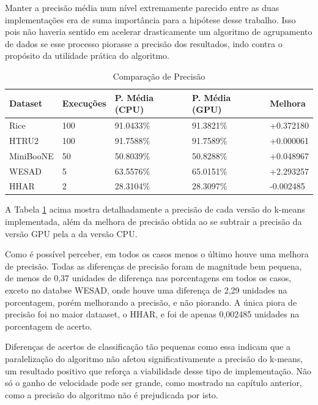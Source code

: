 \documentclass[12pt,
openright, 
oneside, %
a4paper,    %
brazil]{facom-ufu-abntex2}
\begin{document}
Manter a precisão média num nível extremamente parecido entre as duas implementações era de suma importância para a hipótese desse trabalho. Isso pois não haveria sentido em acelerar drasticamente um algoritmo de agrupamento de dados se esse processo piorasse a precisão dos resultados, indo contra o propósito da utilidade prática do algoritmo.

\begin{table}[h]
  \centering
  \caption{Comparação de Precisão}
  \label{tab:avgPrecisionResults}
  \begin{tabular}{|l|l|l|l|l|}
  \hline
  \rowcolor[HTML]{9B9B9B}
  \textbf{Dataset} & \textbf{Execuções} & \textbf{P. Média (CPU)} & \textbf{P. Média (GPU)} & \textbf{Melhora} \\ \hline
  Rice             & 100                & 91.0433\%                     & 91.3821\%                     & +0.372180        \\ \hline
  HTRU2            & 100                & 91.7588\%                     & 91.7589\%                     & +0.000061        \\ \hline
  MiniBooNE        & 50                 & 50.8039\%                     & 50.8288\%                     & +0.048967        \\ \hline
  WESAD            & 5                  & 63.5576\%                     & 65.0151\%                     & +2.293257        \\ \hline
  HHAR             & 2                  & 28.3104\%                     & 28.3097\%                     & -0.002485        \\ \hline
  \end{tabular}
\end{table}

A Tabela \ref{tab:avgPrecisionResults} acima mostra detalhadamente a precisão de cada versão do k-means implementada, além da melhora de precisão obtida ao se subtrair a precisão da versão GPU pela a da versão CPU.

Como é possível perceber, em todos os casos menos o último houve uma melhora de precisão. Todas as diferenças de precisão foram de magnitude bem pequena, de menos de 0,37 unidades de diferença nas porcentagens em todos os casos, exceto no databse WESAD, onde houve uma diferença de 2,29 unidades na porcentagem, porém melhorando a precisão, e não piorando. A única piora de precisão foi no maior dataaset, o HHAR, e foi de apenas 0,002485 unidades na porcentagem de acerto.

Diferenças de acertos de classificação tão pequenas como essa indicam que a paralelização do algoritmo não afetou significativamente a precisão do k-means, um resultado positivo que reforça a viabilidade desse tipo de implementação. Não só o ganho de velocidade pode ser grande, como mostrado na capítulo anterior, como a precisão do algoritmo não é prejudicada por isto.
\end{document}
